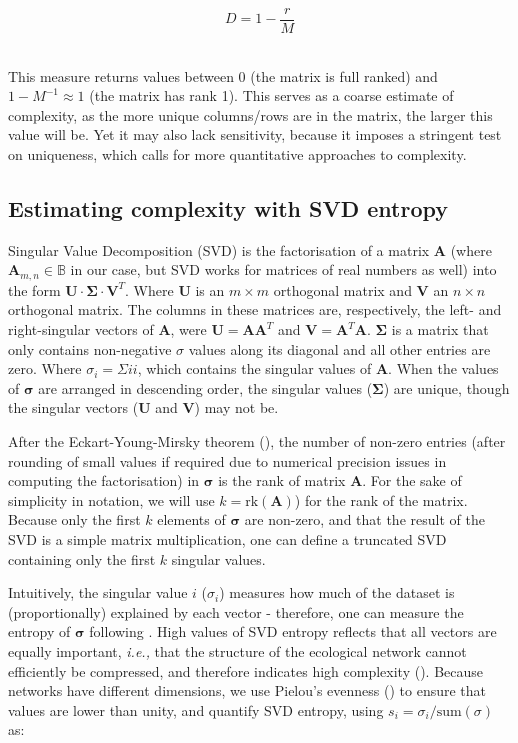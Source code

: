 \begin{refsection}
\[D = 1-\frac{r}{M}\]\

This measure returns values between 0 (the matrix is full ranked) and \(1-M^{-1}
\approx 1\) (the matrix has rank 1). This serves as a coarse estimate of
complexity, as the more unique columns/rows are in the matrix, the larger this
value will be. Yet it may also lack sensitivity, because it imposes a stringent
test on uniqueness, which calls for more quantitative approaches to complexity.

\subsection{Estimating complexity with SVD
entropy}\label{estimating-complexity-with-svd-entropy}

Singular Value Decomposition (SVD) is the factorisation of a matrix
\(\mathbf{A}\) (where \(\mathbf{A}_{m,n} \in\mathbb{B}\) in our case, but SVD
works for matrices of real numbers as well) into the form
\(\mathbf{U}\cdot\mathbf{\Sigma}\cdot \mathbf{V}^T\). Where \(\mathbf{U}\) is an
\(m \times m\) orthogonal matrix and \(\mathbf{V}\) an \(n \times n\) orthogonal
matrix. The columns in these matrices are, respectively, the left- and
right-singular vectors of \(\mathbf{A}\), were \(\mathbf{U} =
\mathbf{A}\mathbf{A}^T\) and \(\mathbf{V} = \mathbf{A}^T\mathbf{A}\).
\(\mathbf{\Sigma}\) is a matrix that only contains non-negative \(\sigma\)
values along its diagonal and all other entries are zero. Where \(\sigma_{i} =
\Sigma{ii}\), which contains the singular values of \(\mathbf{A}\). When the
values of \(\mathbf{\sigma}\) are arranged in descending order, the singular
values (\(\mathbf{\Sigma}\)) are unique, though the singular vectors
(\(\mathbf{U}\) and \(\mathbf{V}\)) may not be.

After the Eckart-Young-Mirsky theorem (\cite{Eckart1936AppOne, Golub1987GenEck}),
the number of non-zero entries (after rounding of small values if required due
to numerical precision issues in computing the factorisation) in
\(\mathbf{\sigma}\) is the rank of matrix \(\mathbf{A}\). For the sake of
simplicity in notation, we will use \(k = \text{rk}(\mathbf{A})\)) for the rank
of the matrix. Because only the first \(k\) elements of \(\mathbf{\sigma}\) are
non-zero, and that the result of the SVD is a simple matrix multiplication, one
can define a truncated SVD containing only the first \(k\) singular values.

Intuitively, the singular value \(i\) (\(\sigma_i\)) measures how much of the
dataset is (proportionally) explained by each vector - therefore, one can
measure the entropy of \(\mathbf{\sigma}\) following \cite{Shannon1948MatThe}. High
values of SVD entropy reflects that all vectors are equally important,
\emph{i.e.,} that the structure of the ecological network cannot efficiently be
compressed, and therefore indicates high complexity (\cite{Gu2016HowLon}). Because
networks have different dimensions, we use Pielou's evenness
(\cite{Pielou1975EcoDiv}) to ensure that values are lower than unity, and quantify
SVD entropy, using \(s_i = \sigma_i/\text{sum}(\sigma)\) as:


\end{refsection}
